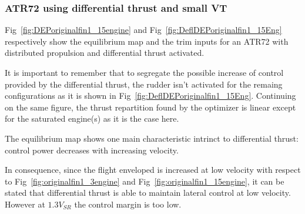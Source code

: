 \subsubsection{ATR72 using differential thrust and small VT}
Fig~\ref{fig:DEPoriginalfin1_15engine} and Fig~\ref{fig:DeflDEPoriginalfin1_15Eng} respectively show the equilibrium map and the trim inputs for an ATR72 with distributed propulsion and differential thrust activated.

It is important to remember that to segregate the possible increase of control provided by the differential thrust, the rudder isn't activated for the remaing configurations as it is shown in Fig~\ref{fig:DeflDEPoriginalfin1_15Eng}. Continuing on the same figure, the thrust repartition found by the optimizer is linear except for the saturated engine(s) as it is the case here.

The equilibrium map shows one main characteristic intrinct to differential thrust: control power decreases with increasing velocity.

In consequence, since the flight enveloped is increased at low velocity with respect to Fig~\ref{fig:originalfin1_3engine} and Fig~\ref{fig:originalfin1_15engine}, it can be stated that differential thrust is able to maintain lateral control at low velocity. However at $1.3V_{SR}$ the control margin is too low.

